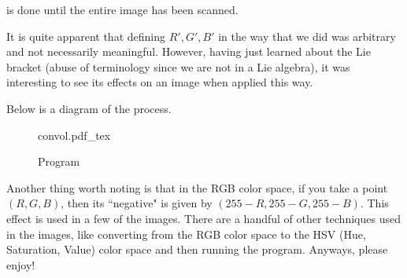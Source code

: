 \documentclass[12pt]{article}
\newcommand{\incfig}[1]{%
    \def\svgwidth{\columnwidth}
    {#1.pdf_tex}
}
\theoremstyle{definition}
\theoremstyle{definition}
\begin{document}
    is done until the entire image has been scanned.\par It is quite apparent
    that defining $R', G', B'$ in the way that we did was arbitrary and not
    necessarily meaningful. However, having just learned about the Lie bracket
    (abuse of terminology since we are not in a Lie algebra),
    it was interesting to see its effects on an image when applied this way. \par Below is
    a diagram of the process.
        \begin{figure}[htp!]
        \centering
          \incfig{convol}
          \caption{Program}
          \label{fig:action}
      \end{figure}\hfill\par\newpage
    Another thing worth noting is that in the RGB color space, if you take
    a point $(R, G, B)$, then its ``negative" is given by $(255-R, 255-G,
    255-B)$. This effect is used in a few of the images. There are a handful of
    other techniques used in the images, like converting from the RGB color
    space to the HSV (Hue, Saturation, Value) color space and then running the
    program. Anyways, please enjoy!
\end{document}
